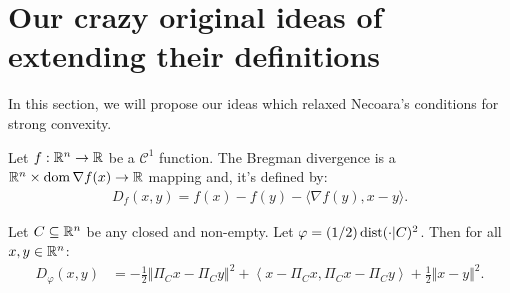 \documentclass[12pt]{article}
\begin{document}
\section{Our crazy original ideas of extending their definitions}
    In this section, we will propose our ideas which relaxed Necoara's conditions for strong convexity.
    \begin{definition}\label{def:bd}
        Let $f: \mathbb R^n \rightarrow \mathbb R$ be a $\mathcal C^1$ function. 
        The Bregman divergence is a $\mathbb R^n \times \operatorname{dom} \nabla f(x)\rightarrow \mathbb R$ mapping and, it's defined by:  
        \begin{align*}
            D_f(x, y) = f(x) - f(y) - \langle \nabla f(y), x - y\rangle. 
        \end{align*}
    \end{definition}
    \begin{theorem}\label{thm:bd-dist-sq}
        Let $C \subseteq \mathbb R^n$ be any closed and non-empty. 
        Let $\varphi = (1/2)\operatorname{dist}(\cdot | C)^2$.
        Then for all $x, y \in \mathbb R^n$: 
        \begin{align*}
            D_{\varphi}(x, y) 
            &= 
            - \frac{1}{2}\Vert \Pi_C x - \Pi_C y\Vert^2
            + \left\langle x - \Pi_C x, \Pi_C x - \Pi_C y\right\rangle
            + \frac{1}{2} \Vert x - y\Vert^2. 
        \end{align*}
    \end{theorem}
\end{document}
